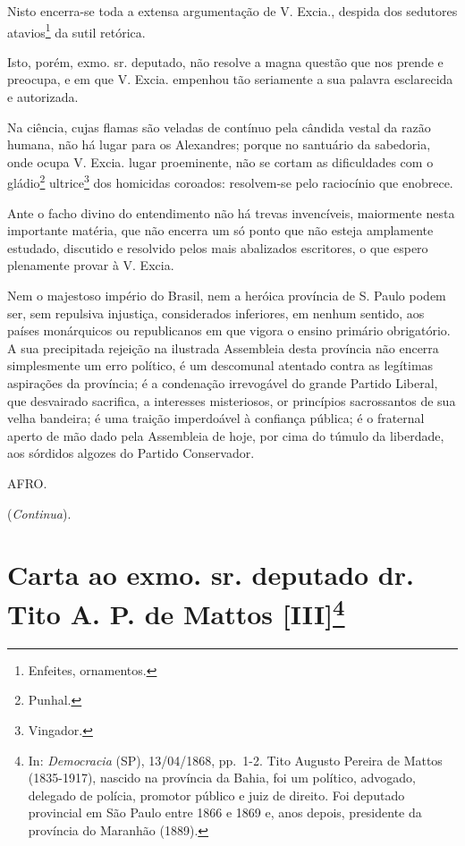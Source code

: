 Nisto encerra-se toda a extensa argumentação de V. Excia., despida dos
sedutores atavios\footnote{Enfeites, ornamentos.} da sutil retórica.

Isto, porém, exmo. sr. deputado, não resolve a magna questão que nos
prende e preocupa, e em que V. Excia. empenhou tão seriamente a sua
palavra esclarecida e autorizada.

Na ciência, cujas flamas são veladas de contínuo pela cândida vestal da
razão humana, não há lugar para os Alexandres; porque no santuário da
sabedoria, onde ocupa V. Excia. lugar proeminente, não se cortam as
dificuldades com o gládio\footnote{Punhal.} ultrice\footnote{
  Vingador.} dos homicidas coroados: resolvem-se pelo raciocínio que
enobrece.

Ante o facho divino do entendimento não há trevas invencíveis,
maiormente nesta importante matéria, que não encerra um só ponto que não
esteja amplamente estudado, discutido e resolvido pelos mais abalizados
escritores, o que espero plenamente provar à V. Excia.

Nem o majestoso império do Brasil, nem a heróica província de S. Paulo
podem ser, sem repulsiva injustiça, considerados inferiores, em nenhum
sentido, aos países monárquicos ou republicanos em que vigora o ensino
primário obrigatório. A sua precipitada rejeição na ilustrada Assembleia
desta província não encerra simplesmente um erro político, é um
descomunal atentado contra as legítimas aspirações da província; é a
condenação irrevogável do grande Partido Liberal, que desvairado
sacrifica, a interesses misteriosos, or princípios sacrossantos de sua
velha bandeira; é uma traição imperdoável à confiança pública; é o
fraternal aperto de mão dado pela Assembleia de hoje, por cima do túmulo
da liberdade, aos sórdidos algozes do Partido Conservador.

AFRO.

(\emph{Continua}).

\chapter{Carta ao exmo. sr. deputado dr. Tito A. P. de Mattos
{[}III{]}\footnote{In: \emph{Democracia} (SP), 13/04/1868, pp.~1-2.
  Tito Augusto Pereira de Mattos (1835-1917), nascido na província da
  Bahia, foi um político, advogado, delegado de polícia, promotor
  público e juiz de direito. Foi deputado provincial em São Paulo entre
  1866 e 1869 e, anos depois, presidente da província do Maranhão
  (1889).}}

